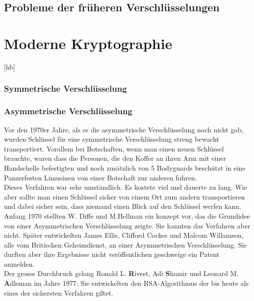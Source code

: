\subsection{Probleme der früheren Verschlüsselungen}




\section{Moderne Kryptographie}[hb]

\subsubsection{Symmetrische Verschlüsselung}
\subsubsection{Asymmetrische Verschlüsselung}
Vor den 1970er Jahre, als es die asymmetrische Verschlüsselung noch nicht gab, wurden Schlüssel für eine symmetrische Verschlüsselung streng bewacht transportiert.
Vorallem bei Botschaften, wenn man einen neuen Schlüssel brauchte, waren dass die Personen, die den Koffer an ihren Arm mit einer Handschelle befestigten und noch zusätzlich von 5 Bodyguards beschützt in eine Panzerfesten Limusinen von einer Botschaft zur anderen fuhren.\\
Dieses Verfahren war sehr umständlich. Es kostete viel und dauerte zu lang. Wie aber sollte man einen Schlüssel sicher von einem Ort zum andern transportieren und dabei sicher sein, dass niemand einen Blick auf den Schlüssel werfen kann.\\
Anfang 1970 stellten W. Diffe und M.Hellman ein konzept vor, das die Grundidee von einer Asymmetrischen Verschlüsselung zeigte. Sie kannten das Verfahren aber nicht.
Später entwickelten James Ellis, Clifford Cockes und Malcom Willamson, alle vom Britischen Geheimdienst, an einer Asymmetrischen Verschlüsselung. Sie durften aber ihre Ergebnisse nicht veröffentlichen geschweige ein Patent anmelden.\\
Der grosse Durchbruch gelang Ronald L. \textbf{R}ivest, Adi \textbf{S}hamir und Leonard M. \textbf{A}dleman im Jahre 1977. Sie entwickelten den RSA-Algorithmus der bis heute als eines der sichersten Verfahren giltet.\\[2ex]
%
